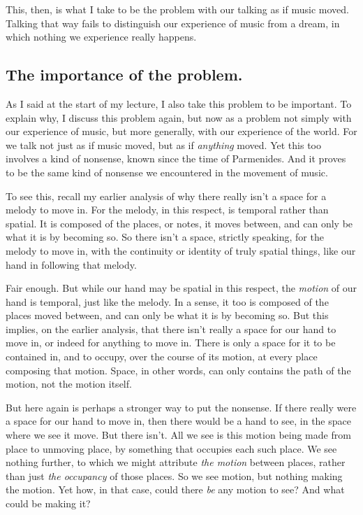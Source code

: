 \documentclass[12pt]{memoir}
\begin{document}
This, then, is what I take to be the problem with our talking as if
music moved. Talking that way fails to distinguish our experience of
music from a dream, in which nothing we experience really happens.

\subsection{The importance of the problem.}

As I said at the start of my lecture, I also take this problem to be
important. To explain why, I discuss this problem again, but now as a
problem not simply with our experience of music, but more generally,
with our experience of the world. For we talk not just as if music
moved, but as if \emph{anything} moved. Yet this too involves a kind of
nonsense, known since the time of Parmenides. And it proves to be the
same kind of nonsense we encountered in the movement of music.

To see this, recall my earlier analysis of why there really isn't a
space for a melody to move in. For the melody, in this respect, is
temporal rather than spatial. It is composed of the places, or notes, it
moves between, and can only be what it is by becoming so. So there isn't
a space, strictly speaking, for the melody to move in, with the
continuity or identity of truly spatial things, like our hand in
following that melody.

Fair enough. But while our hand may be spatial in this respect, the
\emph{motion} of our hand is temporal, just like the melody. In a sense,
it too is composed of the places moved between, and can only be what it
is by becoming so. But this implies, on the earlier analysis, that there
isn't really a space for our hand to move in, or indeed for anything to
move in. There is only a space for it to be contained in, and to occupy,
over the course of its motion, at every place composing that motion.
Space, in other words, can only contains the path of the motion, not the
motion itself.

But here again is perhaps a stronger way to put the nonsense. If there
really were a space for our hand to move in, then there would be a hand
to see, in the space where we see it move. But there isn't. All we see
is this motion being made from place to unmoving place, by something
that occupies each such place. We see nothing further, to which we might
attribute \emph{the motion} between places, rather than just \emph{the
occupancy} of those places. So we see motion, but nothing making the
motion. Yet how, in that case, could there \emph{be} any motion to see?
And what could be making it?
\end{document}
